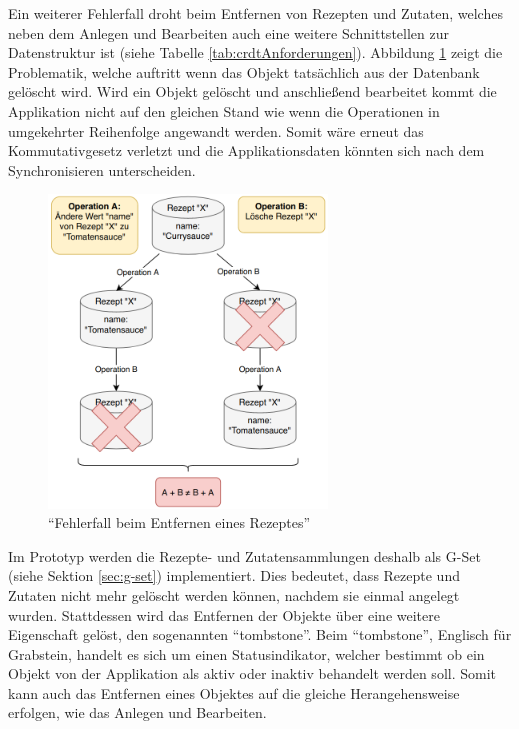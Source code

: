 \documentclass[a4paper, 12pt]{scrreprt}
\begin{document}
Ein weiterer Fehlerfall droht beim Entfernen von Rezepten und Zutaten, welches neben dem Anlegen und Bearbeiten auch eine weitere Schnittstellen zur Datenstruktur ist (siehe Tabelle \ref{tab:crdtAnforderungen}). Abbildung \ref{fig:rezeptLöschenSchlecht} zeigt die Problematik, welche auftritt wenn das Objekt tatsächlich aus der Datenbank gelöscht wird. Wird ein Objekt gelöscht und anschließend bearbeitet kommt die Applikation nicht auf den gleichen Stand wie wenn die Operationen in umgekehrter Reihenfolge angewandt werden. Somit wäre erneut das Kommutativgesetz verletzt und die Applikationsdaten könnten sich nach dem Synchronisieren unterscheiden. 

\begin{figure}[H]
	\centering
	\includegraphics[width=0.66\textwidth]{deleteRecipeBad.png}
	\caption{\enquote{Fehlerfall beim Entfernen eines Rezeptes}}
	\label{fig:rezeptLöschenSchlecht}
\end{figure}

Im Prototyp werden die Rezepte- und Zutatensammlungen deshalb als G-Set (siehe Sektion \ref{sec:g-set}) implementiert. Dies bedeutet, dass Rezepte und Zutaten nicht mehr gelöscht werden können, nachdem sie einmal angelegt wurden. Stattdessen wird das Entfernen der Objekte über eine weitere Eigenschaft gelöst, den sogenannten \enquote{tombstone}. Beim \enquote{tombstone}, Englisch für Grabstein, handelt es sich um einen Statusindikator, welcher bestimmt ob ein Objekt von der Applikation als aktiv oder inaktiv behandelt werden soll. Somit kann auch das Entfernen eines Objektes auf die gleiche Herangehensweise erfolgen, wie das Anlegen und Bearbeiten.
\end{document}
